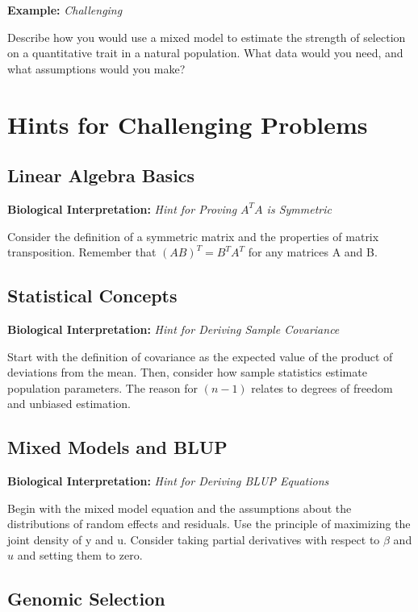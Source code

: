 \documentclass[12pt,a4paper]{article}
\newenvironment{example}[1][]
{\begin{basebox}[linecolor=uqgold]
\textbf{\color{uqgold}Example:} \textit{#1}\par\noindent\ignorespaces}
{\end{basebox}}
\newenvironment{interpretation}[1][]
{\begin{basebox}[linecolor=uqgreen]
\textbf{\color{uqgreen}Biological Interpretation:} \textit{#1}\par\noindent\ignorespaces}
{\end{basebox}}
\begin{document}
\begin{example}[Challenging]
Describe how you would use a mixed model to estimate the strength of selection on a quantitative trait in a natural population. What data would you need, and what assumptions would you make?
\end{example}

\section{Hints for Challenging Problems}

\subsection{Linear Algebra Basics}

\begin{interpretation}[Hint for Proving $A^TA$ is Symmetric]
Consider the definition of a symmetric matrix and the properties of matrix transposition. Remember that $(AB)^T = B^TA^T$ for any matrices A and B.
\end{interpretation}

\subsection{Statistical Concepts}

\begin{interpretation}[Hint for Deriving Sample Covariance]
Start with the definition of covariance as the expected value of the product of deviations from the mean. Then, consider how sample statistics estimate population parameters. The reason for $(n-1)$ relates to degrees of freedom and unbiased estimation.
\end{interpretation}

\subsection{Mixed Models and BLUP}

\begin{interpretation}[Hint for Deriving BLUP Equations]
Begin with the mixed model equation and the assumptions about the distributions of random effects and residuals. Use the principle of maximizing the joint density of y and u. Consider taking partial derivatives with respect to $\beta$ and $u$ and setting them to zero.
\end{interpretation}

\subsection{Genomic Selection}
\end{document}
